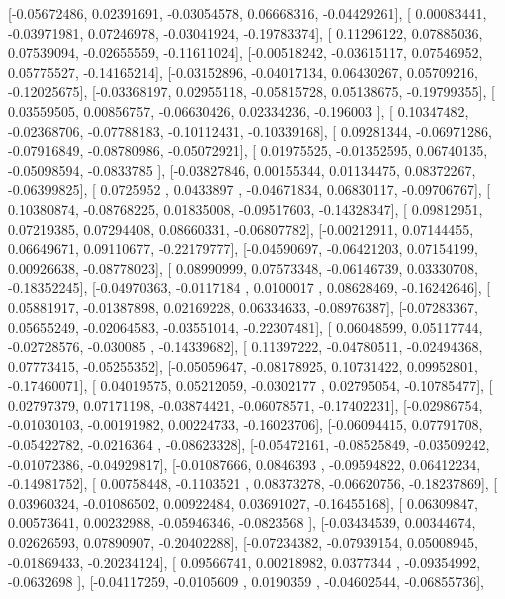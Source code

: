 \documentclass{article}
\begin{document}
       [-0.05672486,  0.02391691, -0.03054578,  0.06668316, -0.04429261],
       [ 0.00083441, -0.03971981,  0.07246978, -0.03041924, -0.19783374],
       [ 0.11296122,  0.07885036,  0.07539094, -0.02655559, -0.11611024],
       [-0.00518242, -0.03615117,  0.07546952,  0.05775527, -0.14165214],
       [-0.03152896, -0.04017134,  0.06430267,  0.05709216, -0.12025675],
       [-0.03368197,  0.02955118, -0.05815728,  0.05138675, -0.19799355],
       [ 0.03559505,  0.00856757, -0.06630426,  0.02334236, -0.196003  ],
       [ 0.10347482, -0.02368706, -0.07788183, -0.10112431, -0.10339168],
       [ 0.09281344, -0.06971286, -0.07916849, -0.08780986, -0.05072921],
       [ 0.01975525, -0.01352595,  0.06740135, -0.05098594, -0.0833785 ],
       [-0.03827846,  0.00155344,  0.01134475,  0.08372267, -0.06399825],
       [ 0.0725952 ,  0.0433897 , -0.04671834,  0.06830117, -0.09706767],
       [ 0.10380874, -0.08768225,  0.01835008, -0.09517603, -0.14328347],
       [ 0.09812951,  0.07219385,  0.07294408,  0.08660331, -0.06807782],
       [-0.00212911,  0.07144455,  0.06649671,  0.09110677, -0.22179777],
       [-0.04590697, -0.06421203,  0.07154199,  0.00926638, -0.08778023],
       [ 0.08990999,  0.07573348, -0.06146739,  0.03330708, -0.18352245],
       [-0.04970363, -0.0117184 ,  0.0100017 ,  0.08628469, -0.16242646],
       [ 0.05881917, -0.01387898,  0.02169228,  0.06334633, -0.08976387],
       [-0.07283367,  0.05655249, -0.02064583, -0.03551014, -0.22307481],
       [ 0.06048599,  0.05117744, -0.02728576, -0.030085  , -0.14339682],
       [ 0.11397222, -0.04780511, -0.02494368,  0.07773415, -0.05255352],
       [-0.05059647, -0.08178925,  0.10731422,  0.09952801, -0.17460071],
       [ 0.04019575,  0.05212059, -0.0302177 ,  0.02795054, -0.10785477],
       [ 0.02797379,  0.07171198, -0.03874421, -0.06078571, -0.17402231],
       [-0.02986754, -0.01030103, -0.00191982,  0.00224733, -0.16023706],
       [-0.06094415,  0.07791708, -0.05422782, -0.0216364 , -0.08623328],
       [-0.05472161, -0.08525849, -0.03509242, -0.01072386, -0.04929817],
       [-0.01087666,  0.0846393 , -0.09594822,  0.06412234, -0.14981752],
       [ 0.00758448, -0.1103521 ,  0.08373278, -0.06620756, -0.18237869],
       [ 0.03960324, -0.01086502,  0.00922484,  0.03691027, -0.16455168],
       [ 0.06309847,  0.00573641,  0.00232988, -0.05946346, -0.0823568 ],
       [-0.03434539,  0.00344674,  0.02626593,  0.07890907, -0.20402288],
       [-0.07234382, -0.07939154,  0.05008945, -0.01869433, -0.20234124],
       [ 0.09566741,  0.00218982,  0.0377344 , -0.09354992, -0.0632698 ],
       [-0.04117259, -0.0105609 ,  0.0190359 , -0.04602544, -0.06855736],
\end{document}
